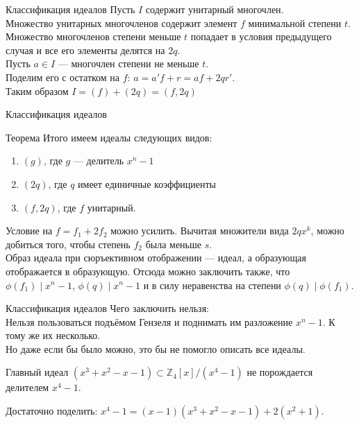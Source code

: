 \documentclass[10pt]{beamer}
\begin{document}
\begin{frame}{Классификация идеалов}
  Пусть $I$ содержит унитарный многочлен.\\
  \vspace{0.4cm}
  Множество унитарных многочленов содержит элемент $f$ минимальной степени $t$. Множество многочленов степени меньше $t$ попадает в условия предыдущего случая и все его элементы делятся на $2q$.\\
  \vspace{0.3cm}
  \pause
  Пусть $a \in I$ --- многочлен степени не меньше $t$.\\
  Поделим его с остатком на $f$: $a = a'f + r = af + 2qr'$.\\
  \vspace{0.2cm}
  Таким образом $I = (f) +  (2q) = (f,2q)$
\end{frame}

\begin{frame}{Классификация идеалов}
  \begin{block}{Теорема}
    Итого имеем идеалы следующих видов:\\
    \begin{enumerate}
      \item $(g)$, где $g$ --- делитель $x^n-1$
      \item $(2q)$, где $q$ имеет единичные коэффициенты
      \item $(f,2q)$, где $f$ унитарный.
    \end{enumerate}
  \end{block}
  \vspace{0.4cm}

  Условие на $f = f_1 + 2f_2$ можно усилить. Вычитая множители вида $2qx^k$, можно добиться того, чтобы степень $f_2$ была меньше $s$.\\
  \vspace{0.2cm}
  Образ идеала при сюръективном отображении --- идеал, а образующая отображается в образующую. Отсюда можно заключить также, что $\phi(f_1) \;|\; x^n-1$, $\phi(q) \;|\; x^n - 1$ и в силу неравенства на степени $\phi(q) \;|\; \phi(f_1)$.
\end{frame}

\begin{frame}{Классификация идеалов}
  Чего заключить нельзя:\\
  \vspace{0.4cm}
  Нельзя пользоваться подъёмом Гензеля и поднимать им разложение $x^n - 1$. К тому же их несколько.\\
  \vspace{0.4cm}
  Но даже если бы было можно, это бы не помогло описать все идеалы.\\
  \begin{example}
    Главный идеал $(x^3+x^2-x-1) \subset \mathbb{Z}_4[x]/(x^4-1)$ не порождается делителем $x^4 - 1$.
  \end{example}
    Достаточно поделить: $x^4 - 1 = (x-1)(x^3 + x^2 - x - 1) + 2(x^2 + 1)$.
\end{frame}
\end{document}
